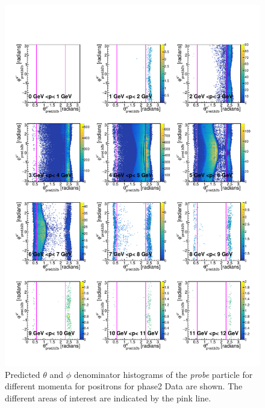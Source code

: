 \documentclass[a4paper,11pt,twosided,final,german,openbib,pdftex,listof=totoc,bibliography=totoc]{scrbook}
\begin{document}
\begin{appendix}
\begin{figure}[h!]
	\includegraphics[width=\textwidth]{Plots/master/RTPMepE_Data.pdf}
	\caption[Enumerator $\theta$-$\phi$ Positron Momentum Phase2 Data]{Predicted $\theta$ and $\phi$ denominator histograms of the \textit{probe} particle for different momenta for positrons for phase2 Data are shown. The different areas of interest are indicated by the pink line.}
	\label{plt:RTPMepE_Data}
\end{figure}



\end{appendix}
\end{document}
